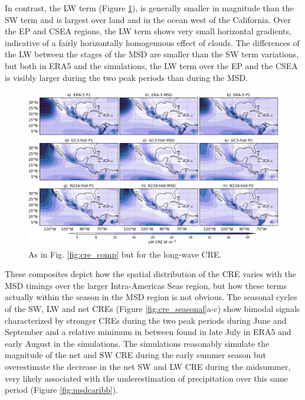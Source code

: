 In contrast, the LW term (Figure \ref{fig:lw_comp}), is generally smaller in magnitude than the SW term and is largest over land and in the ocean west of the California. Over the EP and CSEA regions, the LW term shows very small horizontal gradients, indicative of a fairly horizontally homogenuous effect of clouds. 
The differences of the LW between the stages of the MSD are smaller than the SW term variations, but both in ERA5 and the simulations, the LW term over the EP and the CSEA is visibly larger during the two peak periods than during the MSD. 

\begin{figure}[t!]
\includegraphics[width=\linewidth]{figures/fig4_lwclim_3.png}
\caption{As in Fig. \ref{fig:cre_comp} but for the long-wave CRE.}
\label{fig:lw_comp}
\end{figure}

These composites depict how the spatial distribution of the CRE varies with the MSD timings over the larger Intra-Americas Seas region, but how these terms actually within the season in the MSD region is not obvious. The seasonal cycles of the SW, LW and net CREs (Figure \ref{fig:cre_seasonal}a-c) show bimodal signals characterized by stronger CREs during the two peak periods during June and September and a relative minimum in between found in late July in ERA5 and early August in the simulations. The simulations reasonably simulate the magnitude of the net and SW CRE during the early summer season but overestimate the decrease in the net SW and LW CRE during the midsummer, very likely associated with the underestimation of precipitation over this same period (Figure \ref{fig:msdcaribb}).

